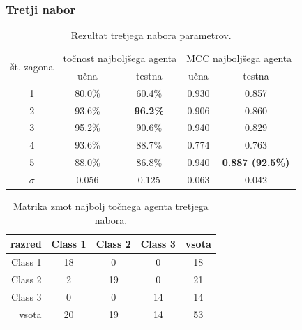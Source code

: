 \subsubsection{Tretji nabor}
\begin{table}[H]
    \begin{center}
        \begin{tabular}{|| c | c c || c c ||}
            \hline
            \multirow{2}{*}{št. zagona} & \multicolumn{2}{c||}{točnost najboljšega agenta} & \multicolumn{2}{c||}{MCC najboljšega agenta} \\ \cline{2-5}
            & učna   & testna          & učna  & testna                  \\
            \hline
            1        & 80.0\% & 60.4\%          & 0.930 & 0.857                   \\
            \hline
            2        & 93.6\% & \textbf{96.2\%} & 0.906 & 0.860                   \\
            \hline
            3        & 95.2\% & 90.6\%          & 0.940 & 0.829                   \\
            \hline
            4        & 93.6\% & 88.7\%          & 0.774 & 0.763                   \\
            \hline
            5        & 88.0\% & 86.8\%          & 0.940 & \textbf{0.887 (92.5\%)} \\
            \hline
            $\sigma$ & 0.056  & 0.125           & 0.063 & 0.042                   \\
            \hline
        \end{tabular}
    \end{center}
    \caption{Rezultat tretjega nabora parametrov.}
    \label{tab:wine_result_3}
\end{table}

\begin{table}[H]
    \centering
    \begin{tabular}{||rcccc||}
        \hline
        razred  & Class 1 & Class 2 & Class 3 & vsota \\ \hline
        Class 1 & 18      & 0       & 0       & 18    \\ \hline
        Class 2 & 2       & 19      & 0       & 21    \\ \hline
        Class 3 & 0       & 0       & 14      & 14    \\ \hline
        vsota   & 20      & 19      & 14      & 53    \\ \hline
    \end{tabular}
    \caption{Matrika zmot najbolj točnega agenta tretjega nabora.}
    \label{tab:wine_acc_3}
\end{table}

